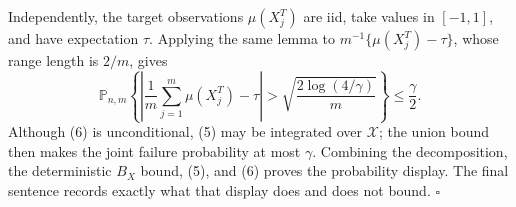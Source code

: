 Independently, the target observations \(\mu(X_j^T)\) are iid, take values in \([-1,1]\), and have expectation \(\tau\). Applying the same lemma to \(m^{-1}\{\mu(X_j^T)-\tau\}\), whose range length is \(2/m\), gives
\[
\mathbb P_{n,m}\!\left\{
\left|\frac1m\sum_{j=1}^m\mu(X_j^T)-\tau\right|>
\sqrt{\frac{2\log(4/\gamma)}m}
\right\}\le\frac\gamma2.
\tag{6}
\]
Although (6) is unconditional, (5) may be integrated over \(\mathscr X\); the union bound then makes the joint failure probability at most \(\gamma\). Combining the decomposition, the deterministic \(B_X\) bound, (5), and (6) proves the probability display. The final sentence records exactly what that display does and does not bound. \(\square\)